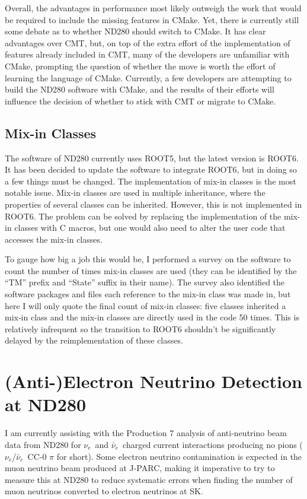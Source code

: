 \documentclass[aps,pra,12pt,notitlepage,tightenlines]{revtex4-1}
\newcommand{\nue}{$\nu_e$}
\newcommand{\anue}{$\bar\nu_e$}
\begin{document}
Overall, the advantages in performance most likely outweigh the work that would be required to include the missing features in CMake. Yet, there is currently still some debate as to whether ND280 should switch to CMake. It has clear advantages over CMT, but, on top of the extra effort of the implementation of features already included in CMT, many of the developers are unfamiliar with CMake, prompting the question of whether the move is worth the effort of learning the language of CMake. Currently, a few developers are attempting to build the ND280 software with CMake, and the results of their efforts will influence the decision of whether to stick with CMT or migrate to CMake.

\subsection{Mix-in Classes}
The software of ND280 currently uses ROOT5, but the latest version is ROOT6. It has been decided to update the software to integrate ROOT6, but in doing so a few things must be changed. The implementation of mix-in classes is the most notable issue. Mix-in classes are used in multiple inheritance, where the properties of several classes can be inherited. However, this is not implemented in ROOT6. The problem can be solved by replacing the implementation of the mix-in classes with C macros, but one would also need to alter the user code that accesses the mix-in classes.

To gauge how big a job this would be, I performed a survey on the software to count the number of times mix-in classes are used (they can be identified by the ``TM'' prefix and ``State'' suffix in their name). The survey also identified the software packages and files each reference to the mix-in class was made in, but here I will only quote the final count of mix-in classes: five classes inherited a mix-in class and the mix-in classes are directly used in the code 50 times. This is relatively infrequent so the transition to ROOT6 shouldn't be significantly delayed by the reimplementation of these classes.

\section{\mbox{(Anti-)Electron} Neutrino Detection at ND280}
I am currently assisting with the Production 7 analysis of anti-neutrino beam data from ND280 for \nue \ and \anue \ charged current interactions producing no pions (\nue/\anue \ CC-0 $\pi$ for short). Some electron neutrino contamination is expected in the muon neutrino beam produced at J-PARC, making it imperative to try to measure this at ND280 to reduce systematic errors when finding the number of muon neutrinos converted to electron neutrinos at SK.
\end{document}
